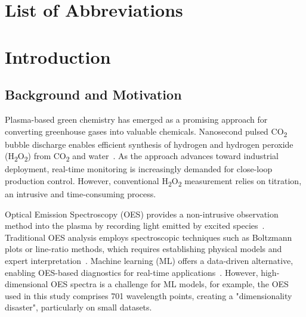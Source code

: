\documentclass[12pt, a4paper]{article}
\begin{document}
\section*{List of Abbreviations}
\begin{acronym}
\end{acronym}

\newpage
\section{Introduction}
\label{sec:intro}

\subsection{Background and Motivation}

Plasma-based green chemistry has emerged as a promising approach for converting greenhouse gases into valuable chemicals. Nanosecond pulsed CO\textsubscript{2} bubble discharge enables efficient synthesis of hydrogen and hydrogen peroxide (H\textsubscript{2}O\textsubscript{2}) from CO\textsubscript{2} and water~\cite{Gao2024NSCO2Discharge, Shao2018PulsedDischarges}. As the approach advances toward industrial deployment, real-time monitoring is increasingly demanded for close-loop production control. However, conventional H\textsubscript{2}O\textsubscript{2} measurement relies on titration, an intrusive and time-consuming process.

Optical Emission Spectroscopy (OES) provides a non-intrusive observation method into the plasma by recording light emitted by excited species~\cite{Laux2003OESAir}. Traditional OES analysis employs spectroscopic techniques such as Boltzmann plots or line-ratio methods, which requires establishing physical models and expert interpretation~\cite{Laux2003OESAir, Srikar2024Accelerated}. Machine learning (ML) offers a data-driven alternative, enabling OES-based diagnostics for real-time applications~\cite{Gidon2019MLCAP}. However, high-dimensional OES spectra is a challenge for ML models, for example, the OES used in this study comprises 701 wavelength points, creating a "dimensionality disaster", particularly on small datasets.
\end{document}
